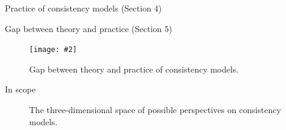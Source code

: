 \documentclass{beamer}
\newcommand{\fig}[3]
{
  \begin{figure}[htp]
    \centering
      \texttt{[image: \#2]}
      \caption[labelInTOC]{#3}
  \end{figure}
}
\begin{document}
\begin{frame}{Practice of consistency models (Section 4)}
\end{frame}
\begin{frame}{Gap between theory and practice (Section 5)}

  \fig{width = 0.70\textwidth}{fig/gap-sla.pdf}
  {Gap between theory and practice of consistency models.}
\end{frame}
\begin{frame}{In scope}
  \begin{figure}
    
    \caption{The three-dimensional space of possible perspectives on
    consistency models.}
  \end{figure}
\end{frame}
\end{document}
